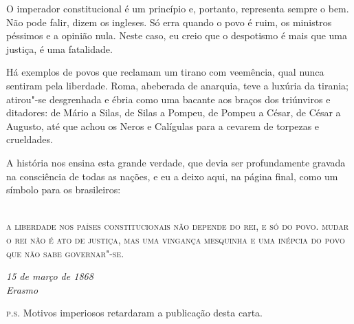  O imperador constitucional é um princípio e, portanto, representa
sempre o bem. Não pode falir, dizem os ingleses. Só erra quando o povo
é ruim, os ministros péssimos e a opinião nula. Neste caso, eu creio
que o despotismo é mais que uma justiça, é uma fatalidade.

 Há exemplos de povos que reclamam um tirano com veemência, qual nunca
sentiram pela liberdade. Roma, abeberada de anarquia, teve a luxúria da
tirania; atirou"-se desgrenhada e ébria como uma bacante aos braços
dos triúnviros e ditadores: de Mário a Silas, de Silas a Pompeu, de
Pompeu a César, de César a Augusto, até que achou os Neros e Calígulas
para a cevarem de torpezas e crueldades.

 A história nos ensina esta grande verdade, que devia ser profundamente
gravada na consciência de todas as nações, e eu a deixo aqui, na página
final, como um símbolo para os brasileiros:\\\ 

\textsc{a liberdade nos países constitucionais não depende do rei, e só do
povo. mudar o rei não é ato de justiça, mas uma vingança mesquinha e
uma inépcia do povo que não sabe governar"-se.}

\begin{flushright}
\textit{15 de março de 1868\\
Erasmo}
\end{flushright}
 

\noindent\textsc{p.s.} Motivos imperiosos retardaram a publicação desta carta.





